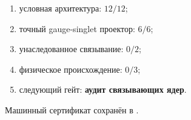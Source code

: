 \begin{protocol}\begin{enumerate}
\item условная архитектура: \textbf{$12/12$};
\item точный gauge-singlet проектор: \textbf{$6/6$};
\item унаследованное связывание: \textbf{$0/2$};
\item физическое происхождение: \textbf{$0/3$};
\item следующий гейт: \textbf{аудит связывающих ядер}.
\end{enumerate}\end{protocol}

Машинный сертификат сохранён в
.